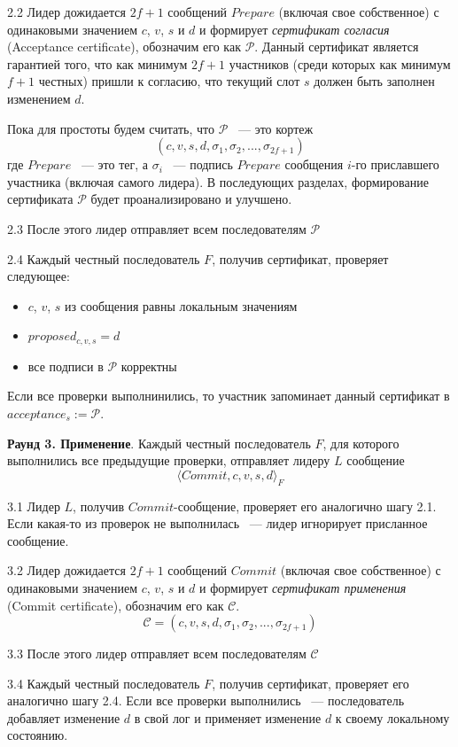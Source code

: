 2.2 Лидер дожидается $2f+1$ сообщений $Prepare$ (включая свое собственное) с одинаковыми значением $c$, $v$, $s$ и $d$ и формирует \textit{сертификат согласия} (Acceptance certificate), обозначим его как $\mathcal{P}$. Данный сертификат является гарантией того, что как минимум $2f+1$ участников (среди которых как минимум $f+1$ честных) пришли к согласию, что текущий слот $s$ должен быть заполнен изменением $d$.

Пока для простоты будем считать, что $\mathcal{P}$ ~--- это кортеж
$$(c, v, s, d, \sigma_1, \sigma_2, ..., \sigma_{2f+1})$$
где $Prepare$ ~--- это тег, а $\sigma_i$ ~--- подпись $Prepare$ сообщения $i$-го приславшего участника (включая самого лидера). 
В последующих разделах, формирование сертификата $\mathcal{P}$ будет проанализировано и улучшено.

2.3 После этого лидер отправляет всем последователям  $\mathcal{P}$

2.4 Каждый честный последователь $F$, получив сертификат, проверяет следующее:
\begin{itemize}
\item $c$, $v$, $s$ из сообщения равны локальным значениям
\item $proposed_{c, v, s} = d$
\item все подписи в $\mathcal{P}$ корректны
\end{itemize}
\vspace{10pt}

Если все проверки выполнинились, то участник запоминает данный сертификат в $acceptance_s := \mathcal{P}$.
\vspace{10pt}

\textbf{Раунд 3. Применение}.
Каждый честный последователь $F$, для которого выполнились все предыдущие проверки, отправляет лидеру $L$ сообщение 
\[ \langle Commit, c, v, s, d \rangle_F \]

3.1 Лидер $L$, получив $Commit$-сообщение, проверяет его аналогично шагу 2.1.
Если какая-то из проверок не выполнилась ~--- лидер игнорирует присланное сообщение. 

3.2 Лидер дожидается $2f+1$ сообщений $Commit$ (включая свое собственное) с одинаковыми значением $c$, $v$, $s$ и $d$ и формирует \textit{сертификат применения} (Commit certificate), обозначим его как $\mathcal{C}$.
$$\mathcal{C}=(c, v, s, d, \sigma_1, \sigma_2, ..., \sigma_{2f+1})$$

3.3 После этого лидер отправляет всем последователям  $\mathcal{C}$

3.4 Каждый честный последователь $F$, получив сертификат, проверяет его аналогично шагу 2.4.
Если все проверки выполнились ~--- последователь добавляет изменение $d$ в свой лог и  применяет изменение $d$ к своему локальному состоянию.

